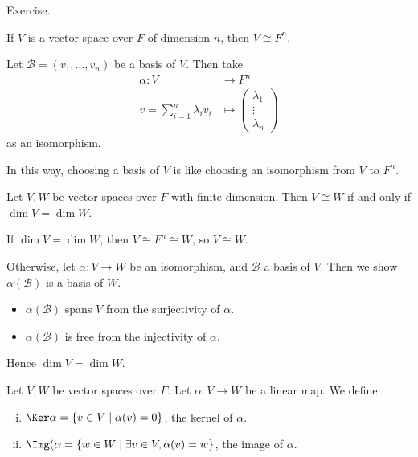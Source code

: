 \documentclass[12pt]{article}
\begin{document}
\begin{proofbox}
	Exercise.
\end{proofbox}

\begin{theorem}
	If $V$ is a vector space over $F$ of dimension $n$, then $V \cong F^{n}$.
\end{theorem}

\begin{proofbox}
	Let $\mathcal{B} = (v_1, \ldots, v_n)$ be a basis of $V$. Then take
	\begin{align*}
		\alpha : V &\to F^{n} \\
		v = \sum_{i = 1}^{n} \lambda_i v_i &\mapsto 
		\begin{pmatrix}
			\lambda_1 \\
			\vdots \\
			\lambda_n
		\end{pmatrix}
	\end{align*}
	as an isomorphism.
\end{proofbox}

\begin{remark}
	In this way, choosing a basis of $V$ is like choosing an isomorphism from $V$ to $F^{n}$.
\end{remark}

\begin{theorem}
	Let $V, W$ be vector spaces over $F$ with finite dimension. Then $V \cong W$ if and only if $\dim V = \dim W$.
\end{theorem}

\begin{proofbox}
	If $\dim V = \dim W$, then $V \cong F^{n} \cong W$, so $V \cong W$.

Otherwise, let $\alpha : V \to W$ be an isomorphism, and $\mathcal{B}$ a basis of $V$. Then we show $\alpha(\mathcal{B})$ is a basis of $W$.
\begin{itemize}
	\item $\alpha(\mathcal{B})$ spans $V$ from the surjectivity of $\alpha$.
	\item $\alpha(\mathcal{B})$ is free from the injectivity of $\alpha$.
\end{itemize}
Hence $\dim V = \dim W$.
\end{proofbox}

\begin{definition}
	Let $V, W$ be vector spaces over $F$. Let $\alpha : V \to W$ be a linear map. We define
	\begin{enumerate}[(i)]
	\item $\Ker \alpha = \{v \in V \mid \alpha(v) = 0\}$, the kernel of $\alpha$.
	\item  $\Img(\alpha = \{w \in W \mid \exists v \in V, \alpha(v) = w\}$, the image of $\alpha$.
	\end{enumerate}
\end{definition}
\end{document}
